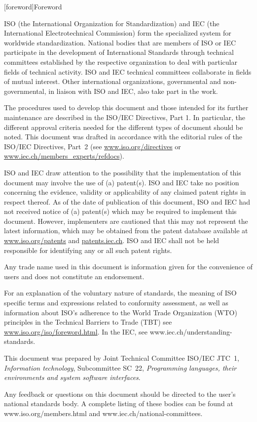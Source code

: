 
[foreword]{Foreword}

ISO (the International Organization for Standardization) and IEC (the International Electrotechnical Commission) form the specialized system for worldwide standardization. National bodies that are members of ISO or IEC participate in the development of International Standards through technical committees established by the respective organization to deal with particular fields of technical activity. ISO and IEC technical committees collaborate in fields of mutual interest. Other international organizations, governmental and non-governmental, in liaison with ISO and IEC, also take part in the work.

The procedures used to develop this document and those intended for its further maintenance are described in the ISO/IEC Directives, Part 1. In particular, the different approval criteria needed for the different types of document should be noted. This document was drafted in accordance with the editorial rules of the ISO/IEC Directives, Part 2 (see \href{www.iso.org/directives}{www.iso.org/directives} 
or 
\href{www.iec.ch/members_experts/refdocs}{www.iec.ch/members_experts/refdocs}).

ISO and IEC draw attention to the possibility that the implementation of this document may involve the use of (a) patent(s). ISO and IEC take no position concerning the evidence, validity or applicability of any claimed patent rights in respect thereof. As of the date of publication of this document, ISO and IEC had not received notice of (a) patent(s) which may be required to implement this document. However, implementers are cautioned that this may not represent the latest information, which may be obtained from the patent database available at \href{www.iso.org/patents}{www.iso.org/patents} 
and 
\href{patents.iec.ch/}{patents.iec.ch}. 
ISO and IEC shall not be held responsible for identifying any or all such patent rights.

Any trade name used in this document is information given for the convenience of users and does not constitute an endorsement.

For an explanation of the voluntary nature of standards, the meaning of ISO specific terms and expressions related to conformity assessment, as well as information about ISO's adherence to the World Trade Organization (WTO) principles in the Technical Barriers to Trade (TBT) see \href{www.iso.org/iso/foreword.html/}{www.iso.org/iso/foreword.html}. In the IEC, see www.iec.ch/understanding-standards.

This document was prepared by Joint Technical Committee ISO/IEC JTC 1, \emph{Information technology}, Subcommittee SC 22, \emph{Programming languages, their environments and system software interfaces}.

Any feedback or questions on this document should be directed to the user’s national standards body. A complete listing of these bodies can be found at www.iso.org/members.html and www.iec.ch/national-committees.
